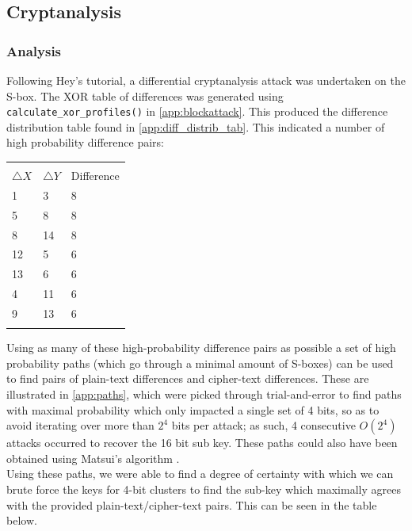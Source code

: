 \documentclass[british,10pt,a4paper]{article}
\begin{document}
\subsection{Cryptanalysis}
\subsubsection{Analysis}
Following Hey's tutorial, a differential cryptanalysis attack was undertaken on
the S-box. The XOR table of differences was generated using \lstinline{calculate_xor_profiles()} in \autoref{app:blockattack}. This produced the difference distribution table found in \autoref{app:diff_distrib_tab}.
This indicated a number of high probability difference pairs:

\begin{center}
	\begin{tabular}{lll}\label{tab:diffpairs} \\
		\toprule \\
		$\triangle X$ & $\triangle Y$ & Difference \\
		1 & 3 & 8 \\
    	5 & 8 & 8 \\
    	8 & 14 & 8 \\
    	12 & 5 & 6 \\
    	13 & 6 & 6 \\
    	4 & 11 & 6 \\
    	9 & 13 & 6 \\
		\bottomrule \\
	\end{tabular}
\end{center}

Using as many of these high-probability difference pairs as possible a set of high probability paths (which go through a minimal amount of S-boxes) can be used to find pairs of plain-text differences and cipher-text differences. These are illustrated in \autoref{app:paths}, which were picked through trial-and-error to find paths with maximal probability which only impacted a single set of 4 bits, so as to avoid iterating over more than \(2^4\) bits per attack; as such, 4 consecutive \(O(2^4)\) attacks occurred to recover the 16 bit sub key. These paths could also have been obtained using Matsui's algorithm \cite{matsui}. 
\\ 
Using these paths, we were able to find a degree of certainty with which we can brute force the keys for 4-bit clusters to find the sub-key which maximally agrees with the provided plain-text/cipher-text pairs. This can be seen in the table below.
\end{document}
